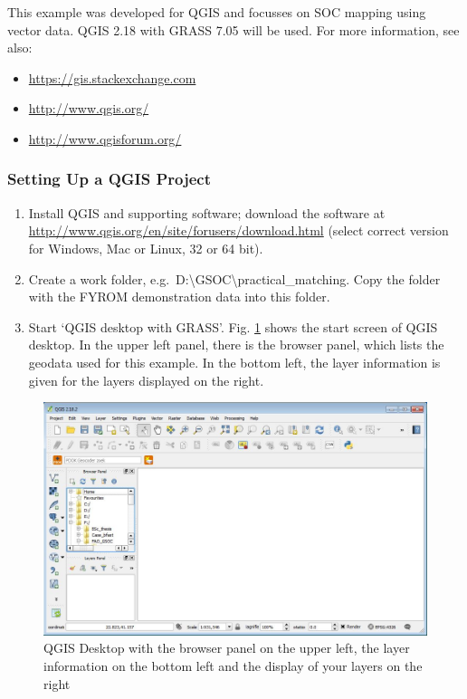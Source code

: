 \documentclass[10pt,b5paper,]{book}
\providecommand{\tightlist}{%
  \setlength{\itemsep}{0pt}\setlength{\parskip}{0pt}}
\theoremstyle{definition}
\theoremstyle{definition}
\theoremstyle{definition}
\theoremstyle{remark}
\begin{document}
This example was developed for QGIS and focusses on SOC mapping using
vector data. QGIS 2.18 with GRASS 7.05 will be used. For more
information, see also:

\begin{itemize}
\tightlist
\item
  \url{https://gis.stackexchange.com}
\item
  \url{http://www.qgis.org/}
\item
  \url{http://www.qgisforum.org/}
\end{itemize}

\hypertarget{setting-up-a-qgis-project}{%
\subsubsection{Setting Up a QGIS
Project}\label{setting-up-a-qgis-project}}

\begin{enumerate}
\def\labelenumi{\arabic{enumi}.}
\tightlist
\item
  Install QGIS and supporting software; download the software at
  \url{http://www.qgis.org/en/site/forusers/download.html} (select
  correct version for Windows, Mac or Linux, 32 or 64 bit).
\item
  Create a work folder,
  e.g.~D:\textbackslash{}GSOC\textbackslash{}practical\_matching. Copy
  the folder with the FYROM demonstration data into this folder.
\item
  Start `QGIS desktop with GRASS'. Fig. \ref{fig:qgis} shows the start
  screen of QGIS desktop. In the upper left panel, there is the browser
  panel, which lists the geodata used for this example. In the bottom
  left, the layer information is given for the layers displayed on the
  right.
\end{enumerate}

\begin{figure}

{\centering \includegraphics[width=0.8\linewidth]{images/Conv_upscaling1} 

}

\caption{QGIS Desktop with the browser panel on the upper left, the layer information on the bottom left and the display of your layers on the right}\label{fig:qgis}
\end{figure}
\end{document}

